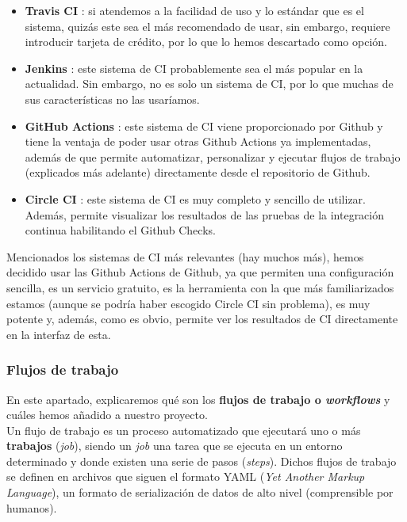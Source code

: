     \begin{itemize}
        \item \textbf{Travis CI} \cite{travis-ci}: si atendemos a la facilidad de uso y lo
        estándar que es el sistema, quizás este sea el más recomendado de usar, sin embargo,
        requiere introducir tarjeta de crédito, por lo que lo hemos descartado como opción.
        \item \textbf{Jenkins} \cite{jenkins}: este sistema de CI probablemente sea el más
        popular en la actualidad. Sin embargo, no es solo un sistema de CI, por lo
        que muchas de sus características no las usaríamos.
        \item \textbf{GitHub Actions} \cite{github-actions}: este sistema de CI viene
        proporcionado por Github y tiene la ventaja de poder usar otras Github Actions ya
        implementadas, además de que permite automatizar, personalizar y ejecutar flujos de
        trabajo (explicados más adelante) directamente desde el repositorio de Github.
        \item \textbf{Circle CI} \cite{circle-ci}: este sistema de CI es muy completo y
        sencillo de utilizar. Además, permite visualizar los resultados de las pruebas de la
        integración continua habilitando el Github Checks.
    \end{itemize}

    Mencionados los sistemas de CI más relevantes (hay muchos más), hemos decidido usar las
    Github Actions de Github, ya que permiten una configuración sencilla, es un servicio
    gratuito, es la herramienta con la que más familiarizados estamos (aunque se podría haber
    escogido Circle CI sin problema), es muy potente y, además, como es obvio, permite ver los
    resultados de CI directamente en la interfaz de esta.

\subsubsection{Flujos de trabajo}
En este apartado, explicaremos qué son los \textbf{flujos de trabajo o \textit{workflows}} y
cuáles hemos añadido a nuestro proyecto.\\

Un flujo de trabajo es un proceso automatizado que ejecutará uno o más \textbf{trabajos}
(\textit{job}), siendo un \textit{job} una tarea que se ejecuta en un entorno determinado y
donde existen una serie de pasos (\textit{steps}). Dichos flujos de trabajo se definen en
archivos que siguen el formato YAML (\textit{Yet Another Markup Language}), un formato de
serialización de datos de alto nivel (comprensible por humanos).\\

